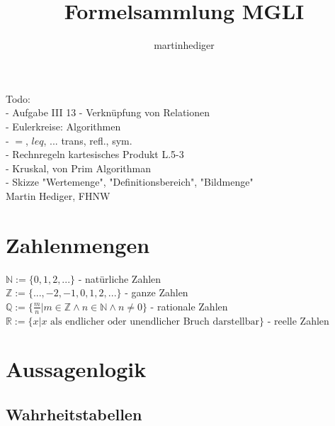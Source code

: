 \documentclass[8pt,landscape]{scrartcl}
\author{martinhediger}
\title{Formelsammlung MGLI}
\begin{document}
\setlength{\columnsep}{1cm}
\begin{multicols}{3}
Todo:\\
- Aufgabe III 13
- Verkn\"upfung von Relationen\\
- Eulerkreise: Algorithmen\\
- $=$, $leq$, ... trans, refl., sym.\\
- Rechnregeln kartesisches Produkt L.5-3\\
- Kruskal, von Prim Algorithman\\
- Skizze "Wertemenge", "Definitionsbereich", "Bildmenge"\\
Martin Hediger, FHNW



\section{Zahlenmengen}
$\mathbb{N} := \{0, 1, 2, ...\} $ - nat\"urliche Zahlen\\
$\mathbb{Z} := \{..., -2, -1, 0, 1, 2, ...\}$ - ganze Zahlen\\
$\mathbb{Q} := \{\frac{m}{n} | m \in \mathbb{Z} \land n \in \mathbb{N} \land n \neq 0 \}$ - rationale Zahlen\\
$\mathbb{R} := \{x | x \mbox{ als endlicher oder unendlicher Bruch darstellbar} \}$ - reelle Zahlen



\section{Aussagenlogik}

\subsection{Wahrheitstabellen}


\end{multicols}
\end{document}
